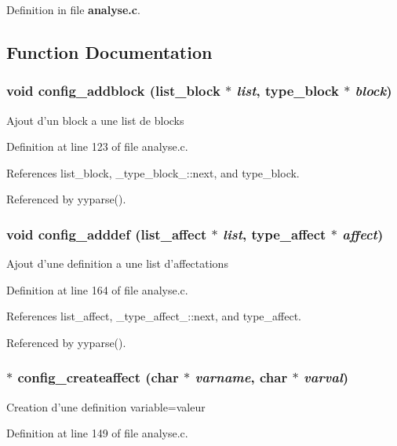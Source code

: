 Definition in file {\bf analyse.c}.

\subsection{Function Documentation}
\subsubsection{\setlength{\rightskip}{0pt plus 5cm}void config\_\-addblock ({\bf list\_\-block} $\ast$ {\em list}, {\bf type\_\-block} $\ast$ {\em block})}\label{analyse_8c_a2}


Ajout d'un block a une list de blocks 

Definition at line 123 of file analyse.c.

References list\_\-block, \_\-type\_\-block\_\-::next, and type\_\-block.

Referenced by yyparse().
\subsubsection{\setlength{\rightskip}{0pt plus 5cm}void config\_\-adddef ({\bf list\_\-affect} $\ast$ {\em list}, {\bf type\_\-affect} $\ast$ {\em affect})}\label{analyse_8c_a5}


Ajout d'une definition a une list d'affectations 

Definition at line 164 of file analyse.c.

References list\_\-affect, \_\-type\_\-affect\_\-::next, and type\_\-affect.

Referenced by yyparse().
\subsubsection{$\ast$ config\_\-createaffect (char $\ast$ {\em varname}, char $\ast$ {\em varval})}\label{analyse_8c_a4}


Creation d'une definition variable=valeur 

Definition at line 149 of file analyse.c.

